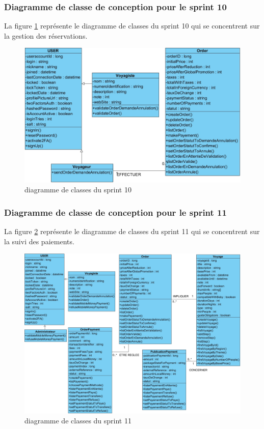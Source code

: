 \documentclass[12pt]{report}
\begin{document}
			\subsubsection{Diagramme de classe de conception pour le sprint 10}
				
			\hspace{15pt} La figure \ref{fig:sprint10} représente le diagramme de classes du sprint 10 qui se concentrent sur la gestion des réservations.


			\begin{figure}[h]
				\centering
				\includegraphics[width=\textwidth]{sprint10.jpg}
				\caption{diagramme de classes du sprint 10}
				\label{fig:sprint10}
			\end{figure}
			\FloatBarrier

			\subsubsection{Diagramme de classe de conception pour le sprint 11}
				
			\hspace{15pt} La figure \ref{fig:sprint11} représente le diagramme de classes du sprint 11 qui se concentrent sur la suivi des paiements.


			\begin{figure}[h]
				\centering
				\includegraphics[width=\textwidth]{sprint11.jpg}
				\caption{diagramme de classes du sprint 11}
				\label{fig:sprint11}
			\end{figure}
			\FloatBarrier
\end{document}
